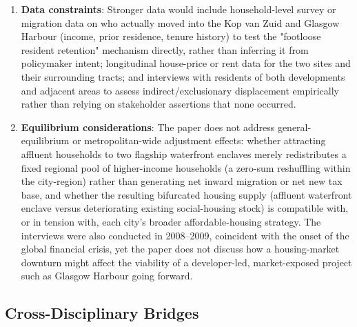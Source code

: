\begin{enumerate}
  \item \textbf{Data constraints}: Stronger data would include household-level survey or migration data on who actually moved into the Kop van Zuid and Glasgow Harbour (income, prior residence, tenure history) to test the "footloose resident retention" mechanism directly, rather than inferring it from policymaker intent; longitudinal house-price or rent data for the two sites and their surrounding tracts; and interviews with residents of both developments and adjacent areas to assess indirect/exclusionary displacement empirically rather than relying on stakeholder assertions that none occurred.
  \item \textbf{Equilibrium considerations}: The paper does not address general-equilibrium or metropolitan-wide adjustment effects: whether attracting affluent households to two flagship waterfront enclaves merely redistributes a fixed regional pool of higher-income households (a zero-sum reshuffling within the city-region) rather than generating net inward migration or net new tax base, and whether the resulting bifurcated housing supply (affluent waterfront enclave versus deteriorating existing social-housing stock) is compatible with, or in tension with, each city's broader affordable-housing strategy. The interviews were also conducted in 2008--2009, coincident with the onset of the global financial crisis, yet the paper does not discuss how a housing-market downturn might affect the viability of a developer-led, market-exposed project such as Glasgow Harbour going forward.
\end{enumerate}

\subsection*{Cross-Disciplinary Bridges}

